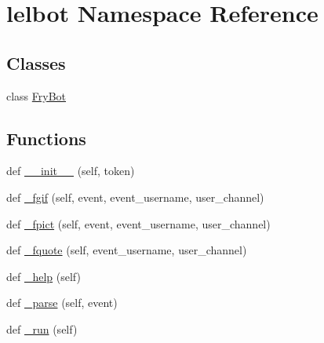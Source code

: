\hypertarget{namespacelelbot}{}\section{lelbot Namespace Reference}
\label{namespacelelbot}
\subsection*{Classes}
\begin{DoxyCompactItemize}
\item 
class \hyperlink{classlelbot_1_1_fry_bot}{Fry\+Bot}
\end{DoxyCompactItemize}
\subsection*{Functions}
\begin{DoxyCompactItemize}
\item 
def \hyperlink{namespacelelbot_ab950fc1ebfe542e47a66412da7f2f607}{\+\_\+\+\_\+init\+\_\+\+\_\+} (self, token)
\item 
def \hyperlink{namespacelelbot_a45132734d842264cd904790c9e7daf8a}{\+\_\+fgif} (self, event, event\+\_\+username, user\+\_\+channel)
\item 
def \hyperlink{namespacelelbot_af161d62a208212e48d636d91672001b6}{\+\_\+fpict} (self, event, event\+\_\+username, user\+\_\+channel)
\item 
def \hyperlink{namespacelelbot_a9482b74505101b4570d3a682800e5776}{\+\_\+fquote} (self, event\+\_\+username, user\+\_\+channel)
\item 
def \hyperlink{namespacelelbot_a7c972dbc79989a22d8a8c2d30678028c}{\+\_\+help} (self)
\item 
def \hyperlink{namespacelelbot_ad8a9d861e4d0dde8ccad3aa6948aa872}{\+\_\+parse} (self, event)
\item 
def \hyperlink{namespacelelbot_a59a73f455afb66c0a2dcdd52f4e82bad}{\+\_\+run} (self)
\end{DoxyCompactItemize}
